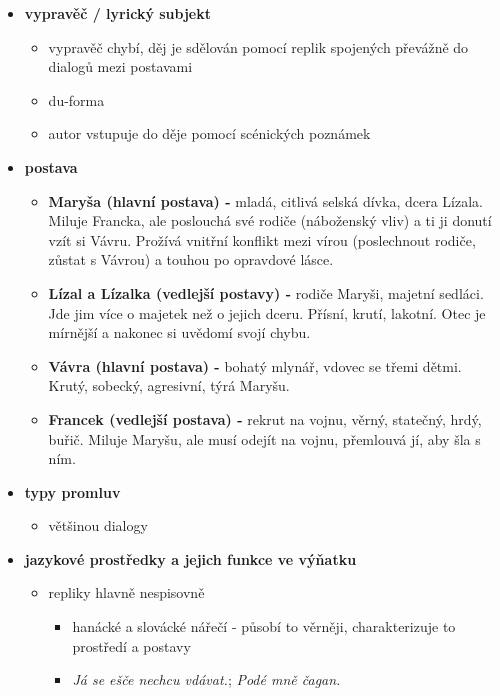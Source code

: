 \documentclass[11pt]{article}
\begin{document}
\begin{itemize}
        \item\textbf{vypravěč / lyrický subjekt}
        \begin{itemize}
            \item vypravěč chybí, děj je sdělován pomocí replik spojených převážně do dialogů mezi postavami
            \item du-forma
            \item autor vstupuje do děje pomocí scénických poznámek
        \end{itemize}
        \item\textbf{postava}
        \begin{itemize}
            \item\textbf{Maryša (hlavní postava) -} mladá, citlivá selská dívka, dcera Lízala. Miluje Francka, ale poslouchá své rodiče (náboženský vliv) a ti ji donutí vzít si Vávru. Prožívá vnitřní konflikt mezi vírou (poslechnout rodiče, zůstat s Vávrou) a touhou po opravdové lásce.
            \item\textbf{Lízal a Lízalka (vedlejší postavy) -} rodiče Maryši, majetní sedláci. Jde jim více o majetek než o jejich dceru. Přísní, krutí, lakotní. Otec je mírnější a nakonec si uvědomí svojí chybu.
            \item\textbf{Vávra (hlavní postava) -} bohatý mlynář, vdovec se třemi dětmi. Krutý, sobecký, agresivní, týrá Maryšu.
            \item\textbf{Francek (vedlejší postava) -} rekrut na vojnu, věrný, statečný, hrdý, buřič. Miluje Maryšu, ale musí odejít na vojnu, přemlouvá jí, aby šla s ním.
        \end{itemize}
        \item\textbf{typy promluv}
        \begin{itemize}
            \item většinou dialogy
        \end{itemize}
        \item\textbf{jazykové prostředky a jejich funkce ve výňatku}
        \begin{itemize}
            \item repliky hlavně nespisovně
            \begin{itemize}
                \item hanácké a slovácké nářečí - působí to věrněji, charakterizuje to prostředí a postavy
                \item \textit{Já se ešče nechcu vdávat.}; \textit{Podé mně čagan.}
            \end{itemize}

\end{itemize}
\end{itemize}
\end{document}
